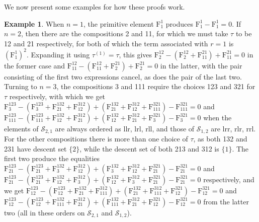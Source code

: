 \documentclass{article}
\theoremstyle{definition}
\newtheorem{ex}[thm]{Example}
\begin{document}
We now present some examples for how these proofs work.
\begin{ex}
When $n=1$, the primitive element $\mathrm{F}_{1}^{1}$ produces $\mathrm{F}_{1}^{1}-\mathrm{F}_{1}^{1}=0$. If $n=2$, then there are the compositions 2 and 11, for which we must take $\tau$ to be 12 and 21 respectively, for both of which the term associated with $r=1$ is $(\mathrm{F}_{1}^{1})^{2}$. Expanding it using $\tau^{(1)}=\tau$, this gives $\mathrm{F}_{2}^{12}-(\mathrm{F}_{2}^{12}+\mathrm{F}_{11}^{21})+\mathrm{F}_{11}^{21}=0$ in the former case and $\mathrm{F}_{11}^{12}-(\mathrm{F}_{11}^{12}+\mathrm{F}_{2}^{21})+\mathrm{F}_{2}^{21}=0$ in the latter, with the pair consisting of the first two expressions cancel, as does the pair of the last two. Turning to $n=3$, the compositions 3 and 111 require the choices 123 and 321 for $\tau$ respectively, with which we get $\mathrm{F}_{3}^{123}-(\mathrm{F}_{3}^{123}+\mathrm{F}_{21}^{132}+\mathrm{F}_{12}^{312})+(\mathrm{F}_{21}^{132}+\mathrm{F}_{12}^{312}+\mathrm{F}_{111}^{321})-\mathrm{F}_{111}^{321}=0$ and $\mathrm{F}_{111}^{123}-(\mathrm{F}_{111}^{123}+\mathrm{F}_{12}^{132}+\mathrm{F}_{21}^{312})+(\mathrm{F}_{12}^{132}+\mathrm{F}_{21}^{312}+\mathrm{F}_{3}^{321})-\mathrm{F}_{3}^{321}=0$ when the elements of $\mathcal{S}_{2,1}$ are always ordered as llr, lrl, rll, and those of $\mathcal{S}_{1,2}$ are lrr, rlr, rrl. For the other compositions there is more than one choice of $\tau$, as both 132 and 231 have descent set $\{2\}$, while the descent set of both 213 and 312 is $\{1\}$. The first two produce the equalities $\mathrm{F}_{21}^{123}-(\mathrm{F}_{21}^{123}+\mathrm{F}_{3}^{132}+\mathrm{F}_{12}^{312})+(\mathrm{F}_{3}^{132}+\mathrm{F}_{12}^{312}+\mathrm{F}_{21}^{321})-\mathrm{F}_{21}^{321}=0$ and $\mathrm{F}_{21}^{123}-(\mathrm{F}_{21}^{123}+\mathrm{F}_{12}^{132}+\mathrm{F}_{3}^{312})+(\mathrm{F}_{12}^{132}+\mathrm{F}_{3}^{312}+\mathrm{F}_{21}^{321})-\mathrm{F}_{21}^{321}=0$ respectively, and we get $\mathrm{F}_{12}^{123}-(\mathrm{F}_{12}^{123}+\mathrm{F}_{21}^{132}+\mathrm{F}_{111}^{312})+(\mathrm{F}_{21}^{132}+\mathrm{F}_{111}^{312}+\mathrm{F}_{12}^{321})-\mathrm{F}_{12}^{321}=0$ and $\mathrm{F}_{12}^{123}-(\mathrm{F}_{12}^{123}+\mathrm{F}_{111}^{132}+\mathrm{F}_{21}^{312})+(\mathrm{F}_{111}^{132}+\mathrm{F}_{21}^{312}+\mathrm{F}_{12}^{321})-\mathrm{F}_{12}^{321}=0$ from the latter two (all in these orders on $\mathcal{S}_{2,1}$ and $\mathcal{S}_{1,2}$). \label{cancsmall}
\end{ex}

\medskip
\end{document}
